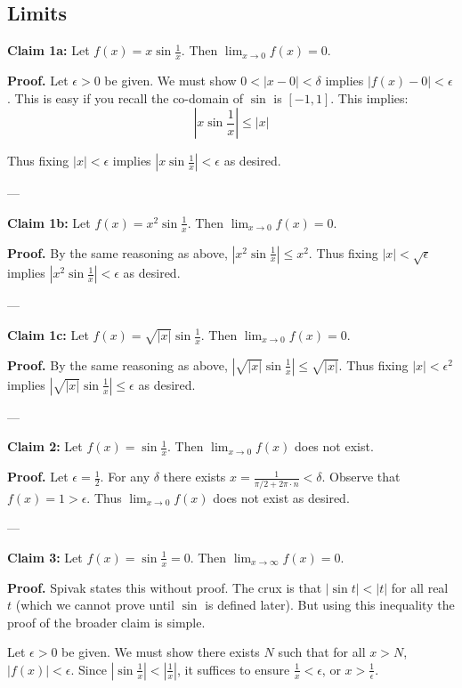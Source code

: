 \clearpage
\subsection{Limits}

\textbf{Claim 1a:} Let $f(x)=x\sin \frac{1}{x}$. Then
$\lim_{x\to0}f(x)=0$.

\textbf{Proof.} Let $\epsilon>0$ be given. We must show
$0<|x-0|<\delta$ implies $|f(x)-0|<\epsilon$. This is easy if you recall
the co-domain of $\sin$ is $[-1,1]$. This implies:
\[\left|x\sin \frac{1}{x}\right|\leq |x|\]

Thus fixing $|x|<\epsilon$ implies
$\left|x\sin \frac{1}{x}\right|<\epsilon$ as desired.



\vs---\vs

\textbf{Claim 1b:} Let $f(x)=x^2\sin \frac{1}{x}$. Then
$\lim_{x\to0}f(x)=0$.

\textbf{Proof.} By the same reasoning as above,
$\left|x^2\sin \frac{1}{x}\right|\leq x^2$. Thus fixing $|x|<\sqrt{\epsilon}$
implies $\left|x^2\sin \frac{1}{x}\right|<\epsilon$ as desired.

\vs---\vs

\textbf{Claim 1c:} Let $f(x)=\sqrt{|x|}\sin \frac{1}{x}$. Then
$\lim_{x\to0}f(x)=0$.

\textbf{Proof.} By the same reasoning as above,
$\left|\sqrt{|x|}\sin \frac{1}{x}\right|\leq \sqrt{|x|}$. Thus fixing
$|x|<\epsilon^2$ implies
$\left|\sqrt{|x|}\sin \frac{1}{x}\right|\leq \epsilon$ as desired.


\vs---\vs

\textbf{Claim 2:} Let $f(x)=\sin \frac{1}{x}$. Then $\lim_{x\to0}f(x)$
does not exist.

\textbf{Proof.} Let $\epsilon=\frac{1}{2}$. For any $\delta$ there exists
$x=\frac{1}{\pi/2+2\pi\cdot n}<\delta$. Observe that
$f(x)=1>\epsilon$. Thus $\lim_{x\to0}f(x)$ does not exist as desired.

\vs---\vs

\textbf{Claim 3:} Let $f(x)=\sin \frac{1}{x}=0$. Then
$\lim_{x\to\infty}f(x)=0$.

\textbf{Proof.} Spivak states this without proof. The crux is that
$|\sin t|<|t|$ for all real $t$ (which we cannot prove until $\sin$ is
defined later). But using this inequality the proof of the broader
claim is simple.

\vs

Let $\epsilon>0$ be given. We must show there exists $N$ such that for all
$x>N$, $|f(x)|<\epsilon$. Since
$\left|\sin \frac{1}{x}\right|<\left|\frac{1}{x}\right|$, it suffices
to ensure $\frac{1}{x}<\epsilon$, or $x>\frac{1}{\epsilon}$.

